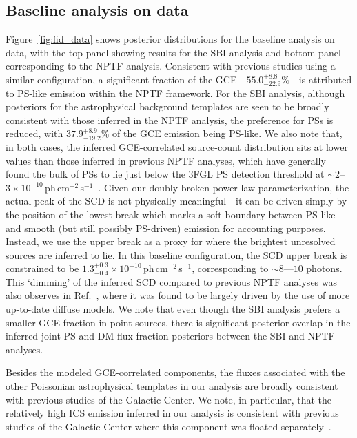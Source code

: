 \documentclass[prd,aps,10pt,nofootinbib,twocolumn,superscriptaddress,preprintnumbers,balancelastpage,longbibliography,floatfix]{revtex4-2}
\newcommand{\changes}[1]{{{\color{red}#1}}}
\begin{document}
\subsection{Baseline analysis on \Fermi data}
\label{sec:baseline}

Figure~\ref{fig:fid_data} shows posterior distributions for the baseline analysis on \Fermi data, with the top panel showing results for the SBI analysis and bottom panel corresponding to the NPTF analysis. Consistent with previous studies using a similar configuration, a significant fraction of the GCE---$55.0^{+8.8}_{-22.9}\%$---is attributed to PS-like emission within the NPTF framework. For the SBI analysis, although posteriors for the astrophysical background templates are seen to be broadly consistent with those inferred in the NPTF analysis, the preference for PSs is reduced, with $37.9^{+8.9}_{-19.2}\%$ of the GCE emission being PS-like. We also note that, in both cases, the inferred GCE-correlated source-count distribution sits at lower values than those inferred in previous NPTF analyses, which have generally found the bulk of PSs to lie just below the 3FGL PS detection threshold at $\sim2$--$3\times 10^{-10}$\,ph\,cm$^{-2}$\,s$^{-1}$~\cite{Lee:2015fea}. Given our doubly-broken power-law parameterization, the actual peak of the SCD is not physically meaningful---it can be driven simply by the position of the lowest break which marks a soft boundary between PS-like and smooth (but still possibly PS-driven) emission for accounting purposes. Instead, we use the upper break as a proxy for where the brightest unresolved sources are inferred to lie. In this baseline configuration, the SCD upper break is constrained to be $1.3^{+0.3}_{-0.4}\times 10^{-10}$\,ph\,cm$^{-2}$\,s$^{-1}$, corresponding to $\sim8$---$10$ photons. This `dimming' of the inferred SCD compared to previous NPTF analyses was also observes in Ref.~\cite{List:2021aer}, where it was found to be largely driven by the use of more up-to-date diffuse models. We note that even though the SBI analysis prefers a smaller GCE fraction in point sources, there is significant posterior overlap in the inferred joint PS and DM flux fraction posteriors between the SBI and NPTF analyses.

\changes{Besides the modeled GCE-correlated components, the fluxes associated with the other Poissonian astrophysical templates in our analysis are broadly consistent with previous studies of the Galactic Center. We note, in particular, that the relatively high ICS emission inferred in our analysis is consistent with previous studies of the Galactic Center where this component was floated separately~\cite{Fermi-LAT:2015sau,List:2021aer,Calore:2014xka,Calore:2014nla}.}
\end{document}
